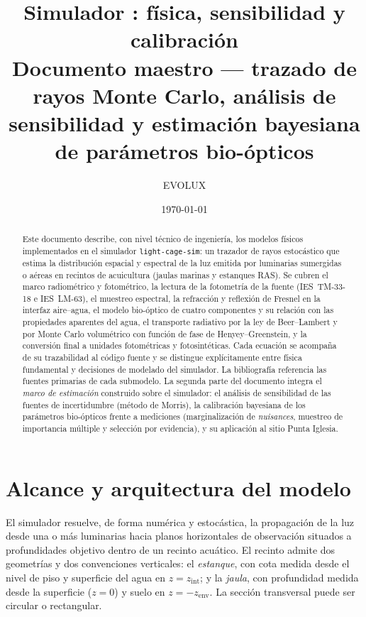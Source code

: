 \documentclass[11pt,a4paper]{article}
\title{\textbf{Simulador \code{light-cage-sim}: física, sensibilidad y calibración}\\[4pt]
\large Documento maestro --- trazado de rayos Monte Carlo, análisis de sensibilidad y estimación bayesiana de parámetros bio-ópticos}
\author{EVOLUX}
\date{\today}
\newcommand{\code}[1]{\texttt{#1}}
\begin{document}
\maketitle

\begin{abstract}
\noindent Este documento describe, con nivel técnico de ingeniería, los modelos
físicos implementados en el simulador \code{light-cage-sim}: un trazador de rayos
estocástico que estima la distribución espacial y espectral de la luz emitida por
luminarias sumergidas o aéreas en recintos de acuicultura (jaulas marinas y
estanques RAS). Se cubren el marco radiométrico y fotométrico, la lectura de la
fotometría de la fuente (IES~TM-33-18 e IES~LM-63), el muestreo espectral, la
refracción y reflexión de Fresnel en la interfaz aire--agua, el modelo bio-óptico
de cuatro componentes y su relación con las propiedades aparentes del agua, el
transporte radiativo por la ley de Beer--Lambert y por Monte Carlo volumétrico con
función de fase de Henyey--Greenstein, y la conversión final a unidades
fotométricas y fotosintéticas. Cada ecuación se acompaña de su trazabilidad al
código fuente y se distingue explícitamente entre física fundamental y decisiones
de modelado del simulador. La bibliografía referencia las fuentes primarias de
cada submodelo. La segunda parte del documento integra el \emph{marco de estimación} construido sobre el simulador: el análisis de sensibilidad de las fuentes de incertidumbre (método de Morris), la calibración bayesiana de los parámetros bio-ópticos frente a mediciones (marginalización de \emph{nuisances}, muestreo de importancia múltiple y selección por evidencia), y su aplicación al sitio Punta Iglesia.
\end{abstract}

\tableofcontents
\bigskip

\section{Alcance y arquitectura del modelo}

El simulador resuelve, de forma numérica y estocástica, la propagación de la luz
desde una o más luminarias hacia planos horizontales de observación situados a
profundidades objetivo dentro de un recinto acuático. El recinto admite dos
geometrías y dos convenciones verticales: el \emph{estanque}, con cota medida desde
el nivel de piso y superficie del agua en $z=z_\text{int}$; y la \emph{jaula}, con
profundidad medida desde la superficie ($z=0$) y suelo en $z=-z_\text{env}$. La
sección transversal puede ser circular o rectangular.
\end{document}
